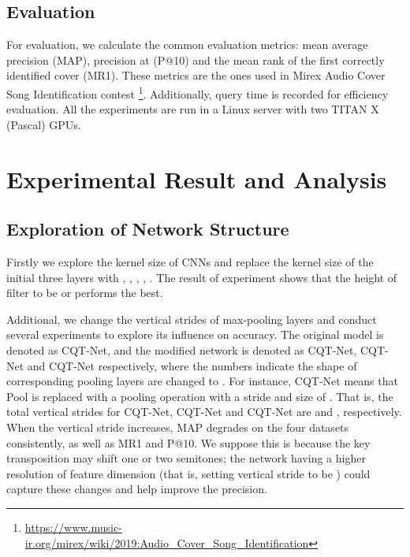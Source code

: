 \documentclass{article}
\begin{document}
\subsection{Evaluation}
For evaluation, we calculate the common evaluation metrics: mean average precision (MAP), precision at  (P@10) and the mean rank of the first correctly identified cover (MR1). These metrics are the ones used in Mirex Audio Cover Song Identification contest \footnote{\url{https://www.music-ir.org/mirex/wiki/2019:Audio_Cover_Song_Identification}}. Additionally, query time is recorded for efficiency evaluation. All the experiments are run in a Linux server with two TITAN X (Pascal) GPUs.

\section{Experimental Result and Analysis}
\subsection{Exploration of Network Structure}
\label{subsec:expl}
Firstly we explore the kernel size of CNNs and replace the kernel size of the initial three layers with {}, {}, {}, {}, {}. The result of experiment shows that the height of filter to be  or  performs the best.

Additional, we change the vertical strides of max-pooling layers and conduct several experiments to explore its influence on accuracy. The original model is denoted as CQT-Net, and the modified network is denoted as CQT-Net, CQT-Net and CQT-Net respectively, where the numbers indicate the shape of corresponding pooling layers are changed to . For instance, CQT-Net means that Pool is replaced with a pooling operation with a stride and size of . That is, the total vertical strides for CQT-Net, CQT-Net and CQT-Net are  and , respectively. When the vertical stride increases, MAP degrades on the four datasets consistently, as well as MR1 and P@10. 
We suppose this is because the key transposition may shift one or two semitones; the network having a higher resolution of feature dimension (that is, setting vertical stride to be ) could capture these changes and help improve the precision. 
\end{document}
